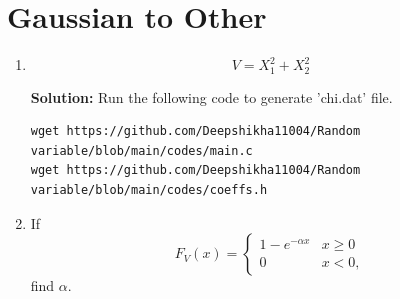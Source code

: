 \documentclass[journal,12pt,twocolumn]{IEEEtran}
\renewcommand\thesection{\arabic{section}}
\begin{document}
\section{Gaussian to Other}
\begin{enumerate}[label=\thesection.\arabic*
,ref=\thesection.\theenumi]
\item
%
\begin{equation}
V = X_1^2 + X_2^2
\end{equation}


\textbf{Solution:}
Run the following code to generate 'chi.dat' file.
\begin{lstlisting}
wget https://github.com/Deepshikha11004/Random variable/blob/main/codes/main.c
wget https://github.com/Deepshikha11004/Random variable/blob/main/codes/coeffs.h
\end{lstlisting}
\item
If
%
\begin{equation}
F_{V}(x) = 
\begin{cases}
1 - e^{-\alpha x} & x \geq 0 \\
0 & x < 0,
\end{cases}
\end{equation}
%
find $\alpha$.



\end{enumerate}
\end{document}
